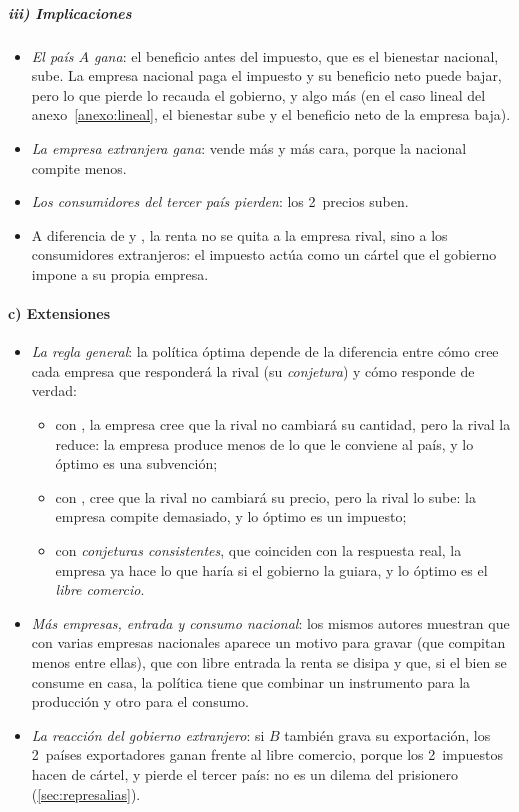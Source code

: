 \documentclass[11pt]{article}
\begin{document}
\subparagraph{iii) Implicaciones}

\begin{itemize}
\item \emph{El país $A$ gana}: el beneficio antes del impuesto, que es el bienestar nacional, sube. La empresa nacional paga el impuesto y su beneficio neto puede bajar, pero lo que pierde lo recauda el gobierno, y algo más (en el caso lineal del anexo~\ref{anexo:lineal}, el bienestar sube y el beneficio neto de la empresa baja).
\item \emph{La empresa extranjera gana}: vende más y más cara, porque la nacional compite menos.
\item \emph{Los consumidores del tercer país pierden}: los 2~precios suben.
\item A diferencia de  y , la renta no se quita a la empresa rival, sino a los consumidores extranjeros: el impuesto actúa como un cártel que el gobierno impone a su propia empresa.
\end{itemize}

\paragraph{c) Extensiones}

\begin{itemize}
\item \emph{La regla general}\nocite{EatonGrossman1986Optimal}: la política óptima depende de la diferencia entre cómo cree cada empresa que responderá la rival (su \emph{conjetura}) y cómo responde de verdad:
  \begin{itemize}
  \item con , la empresa cree que la rival no cambiará su cantidad, pero la rival la reduce: la empresa produce menos de lo que le conviene al país, y lo óptimo es una subvención;
  \item con , cree que la rival no cambiará su precio, pero la rival lo sube: la empresa compite demasiado, y lo óptimo es un impuesto;
  \item con \emph{conjeturas consistentes}, que coinciden con la respuesta real, la empresa ya hace lo que haría si el gobierno la guiara, y lo óptimo es el \emph{libre comercio}.
  \end{itemize}
\item \emph{Más empresas, entrada y consumo nacional}: los mismos autores muestran que con varias empresas nacionales aparece un motivo para gravar (que compitan menos entre ellas), que con libre entrada la renta se disipa y que, si el bien se consume en casa, la política tiene que combinar un instrumento para la producción y otro para el consumo.
\item \emph{La reacción del gobierno extranjero}: si $B$ también grava su exportación, los 2~países exportadores ganan frente al libre comercio, porque los 2~impuestos hacen de cártel, y pierde el tercer país: no es un dilema del prisionero (\ref{sec:represalias}).
\end{itemize}
\end{document}
